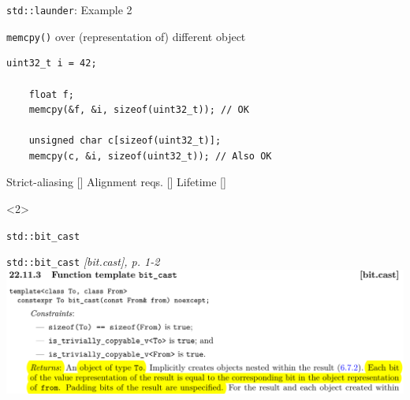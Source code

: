 \begin{frame}[fragile]{\texttt{std::launder}: Example 2}
  
\end{frame}

\begin{frame}[fragile]{\texttt{memcpy()} over (representation of) different object}
  \begin{lstlisting}[style=c++]
    uint32_t i = 42;

    float f;
    memcpy(&f, &i, sizeof(uint32_t)); // OK

    unsigned char c[sizeof(uint32_t)];
    memcpy(c, &i, sizeof(uint32_t)); // Also OK
  \end{lstlisting}

  \vspace{1em}
  \begin{center}
    Strict-aliasing [\OK]\hspace{4em}
    Alignment reqs. [\OK]\hspace{4em}
    Lifetime [\OK]\hspace{4em}
  \end{center}

  \begin{onlyenv}<2>
  \end{onlyenv}
\end{frame}

\begin{frame}{\texttt{std::bit\_cast}}
  \begin{block}{\texttt{std::bit\_cast} \textit{[bit.cast], p. 1-2}}
    \includegraphics[width=\textwidth]{img/cplusplus_draft/bit.cast.png}
  \end{block}
\end{frame}

